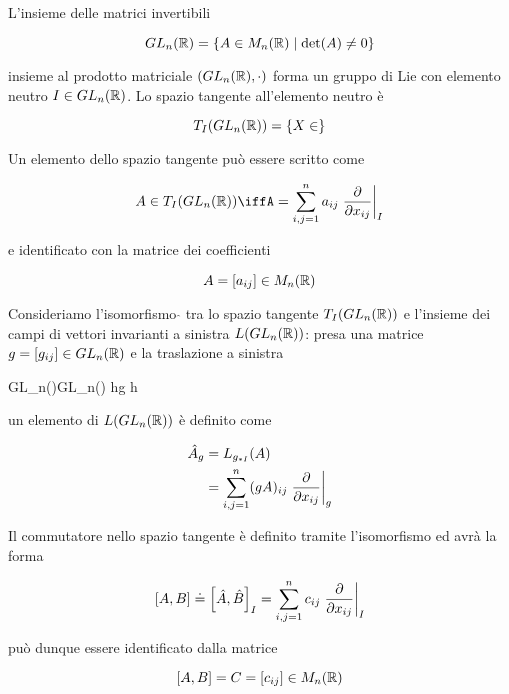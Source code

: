 L'insieme delle matrici invertibili

\begin{equation}
	GL_{n}(\mathbb{R}) = \{ A \in M_{n}(\mathbb{R}) \mid \det(A) \neq 0 \}
\end{equation}

insieme al prodotto matriciale $ (GL_{n}(\mathbb{R}),\cdot) $ forma un gruppo di Lie con elemento neutro $ I \in GL_{n}(\mathbb{R}) $. Lo spazio tangente all'elemento neutro è

\begin{equation}
	T_{I}(GL_{n}(\mathbb{R})) = \{ X \in  \}
\end{equation}

Un elemento dello spazio tangente può essere scritto come

\begin{equation}
	A \in T_{I}(GL_{n}(\R)) %
	\iff%
	A = \sum_{i,j=1}^{n} a_{ij} \eval{ \pdv{x_{ij}} }_{I}
\end{equation}

e identificato con la matrice dei coefficienti

\begin{equation}
	A = [a_{ij}] \in M_{n}(\mathbb{R})
\end{equation}

Consideriamo l'isomorfismo $ \hat{} $ tra lo spazio tangente $ T_{I}(GL_{n}(\mathbb{R})) $ e l'insieme dei campi di vettori invarianti a sinistra $ L(GL_{n}(\mathbb{R})) $: presa una matrice $ g = [g_{ij}] \in GL_{n}(\mathbb{R}) $ e la traslazione a sinistra

%
	{GL_{n}(\R)}{GL_{n}(\R)}%
	{h}{g h}

un elemento di $ L(GL_{n}(\mathbb{R})) $ è definito come

\begin{align}
	\begin{split}
		\hat{A}_{g} &= L_{g_{*I}} (A)\\
		&= \sum_{i,j=1}^{n} (g A)_{ij} \eval{ \pdv{x_{ij}} }_{g}
	\end{split}
\end{align}

Il commutatore nello spazio tangente è definito tramite l'isomorfismo ed avrà la forma

\begin{equation}
	\comm{A}{B} \doteq \comm{\hat{A}}{\hat{B}}_{I} = \sum_{i,j=1}^{n} c_{ij} \eval{ \pdv{x_{ij}} }_{I}
\end{equation}

può dunque essere identificato dalla matrice

\begin{equation}
	\comm{A}{B} = C = [c_{ij}] \in M_{n}(\R)
\end{equation}

